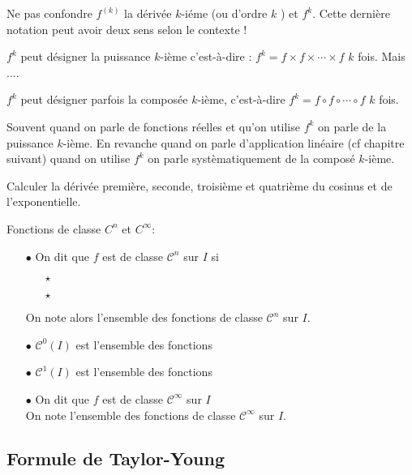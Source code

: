 \documentclass[a4paper, 11pt]{article}
\begin{document}
{\warning  Ne pas confondre $f^{(k)}$ la dérivée $k$-iéme (ou d'ordre $k$ ) et $f^k$. Cette dernière notation peut avoir deux sens  selon le  contexte ! 

$f^k$ peut désigner la puissance $k$-ième c'est-à-dire : 
$f^k=f\times f \times \cdots \times f$ $k$ fois. Mais ....

$f^k$  peut désigner parfois la composée $k$-ième, c'est-à-dire
$f^k=f\circ f \circ \cdots\circ f$ $k$ fois. 

Souvent quand on parle de fonctions réelles et qu'on utilise $f^k$ on parle de la puissance $k$-ième. En revanche quand on parle d'application linéaire (cf chapitre suivant) quand on utilise $f^k$ on parle systèmatiquement de la composé $k$-ième. 


\begin{exercice} 
Calculer la d\'eriv\'ee premi\`ere, seconde, troisi\`eme et quatri\`eme du cosinus et de l'exponentielle.
\end{exercice}
 {\noindent  

\begin{defi} Fonctions de classe $C^n$ et $C^{\infty}$:
\begin{itemize}
\item[$\bullet$]  On dit que $f$ est de classe $\mathcal{C}^n$ sur $I$ si  \vsec
\begin{itemize}
\item[$\star$] \dotfill\vsec
\item[$\star$] \dotfill\vsec
\end{itemize}
On note alors \dotfill l'ensemble des fonctions de classe $\mathcal{C}^n$ sur $I$.\vsec
\item[$\bullet$] $\mathcal{C}^0(I)$ est l'ensemble des fonctions \dotfill \vsec
\item[$\bullet$] $\mathcal{C}^1(I)$ est l'ensemble des fonctions \dotfill \vsec
\item[$\bullet$] On dit que $f$ est de classe $\mathcal{C}^{\infty}$ sur $I$ \dotfill\vsec\\
\noindent  On note \dotfill l'ensemble des fonctions de classe $\mathcal{C}^{\infty}$ sur $I$. \vsec
\end{itemize}
\end{defi}
 }
\subsection{Formule de Taylor-Young}



}
\end{document}
